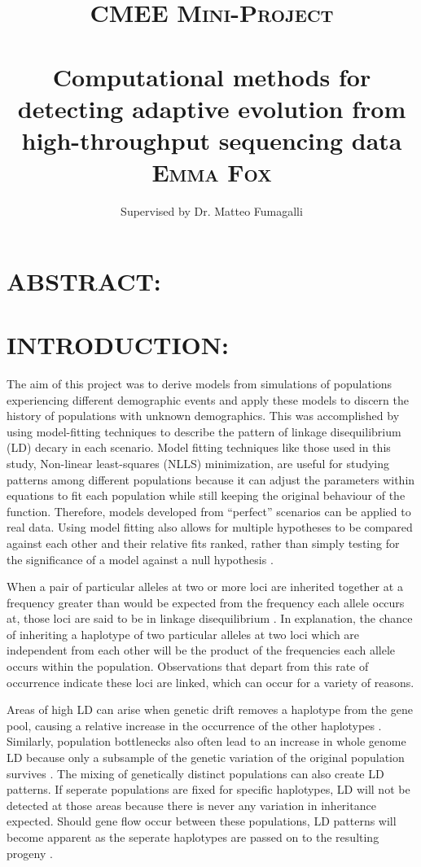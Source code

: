 \documentclass[11pt]{article}
\title{	\huge \textsc{CMEE Mini-Project}
		\\ [3.0cm]
		\HRule{1pt} \\
		\LARGE \textbf{Computational methods for detecting adaptive evolution from high-throughput sequencing data}
		\HRule{1pt} \\ [0.2cm]
		\Large \textsc{Emma Fox}
		\\ [9.0cm]}
\author{ 
		Supervised by Dr. Matteo Fumagalli \\
		}
\date{}
\begin{document}
\maketitle

\newpage
\begin{linenumbers}

\section{ABSTRACT:}

\section{INTRODUCTION:}
The aim of this project was to derive models from simulations of populations experiencing different demographic events and apply these models to discern the history of populations with unknown demographics. This was accomplished by using model-fitting techniques to describe the pattern of linkage disequilibrium (LD) decary in each scenario. Model fitting techniques like those used in this study, Non-linear least-squares (NLLS) minimization, are useful for studying patterns among different populations because it can adjust the parameters within equations to fit each population while still keeping the original behaviour of the function. Therefore, models developed from “perfect” scenarios can be applied to real data. Using model fitting also allows for multiple hypotheses to be compared against each other and their relative fits ranked, rather than simply testing for the significance of a model against a null hypothesis \citep{johnson2004model}.	

When a pair of particular alleles at two or more loci are inherited together at a frequency greater than would be expected from the frequency each allele occurs at, those loci are said to be in linkage disequilibrium \citep{slatkin2008linkage}. In explanation, the chance of inheriting a haplotype of two particular alleles at two loci which are independent from each other will be the product of the frequencies each allele occurs within the population. Observations that depart from this rate of occurrence indicate these loci are linked, which can occur for a variety of reasons. 

Areas of high LD can arise when genetic drift removes a haplotype from the gene pool, causing a relative increase in the occurrence of the other haplotypes \citep{slatkin2008linkage}. Similarly, population bottlenecks also often lead to an increase in whole genome LD because only a subsample of the genetic variation of the original population survives \citep{slatkin2008linkage}. The mixing of genetically distinct populations can also create LD patterns. If seperate populations are fixed for specific haplotypes, LD will not be detected at those areas because there is never any variation in inheritance expected. Should gene flow occur between these populations, LD patterns will become apparent as the seperate haplotypes are passed on to the resulting progeny \citep{slatkin2008linkage}.


\end{linenumbers}
\end{document}
